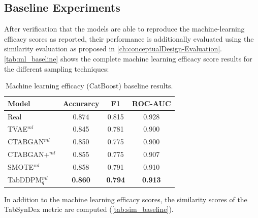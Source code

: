 
\subsection{Baseline Experiments}
\label{ch:Baseline}

After verification that the models are able to reproduce the machine-learning efficacy scores as reported,
their performance is additionally evaluated using the similarity evaluation as proposed in \autoref{ch:conceptualDesign-Evaluation}.
\autoref{tab:ml_baseline} shows the complete machine learning efficacy score results for the different sampling techniques:

\begin{table}[h]
	\centering
	\begin{tabular}{l|c|c|c}
		\hline
		\textbf{Model}     & \textbf{Accurarcy} & \textbf{F1}    & \textbf{ROC-AUC} \\ \hline
		Real               & 0.874              & 0.815          & 0.928            \\ \hline
		TVAE$^{ml}$        & 0.845              & 0.781          & 0.900            \\ \hline
		CTABGAN$^{ml}$     & 0.850              & 0.775          & 0.900            \\ \hline
		CTABGAN+$^{ml}$    & 0.855              & 0.775          & 0.907            \\ \hline
		SMOTE$^{ml}$       & 0.858              & 0.791          & 0.910            \\ \hline
		TabDDPM$^{ml}_{q}$ & \textbf{0.860}     & \textbf{0.794} & \textbf{0.913}   \\ \hline
	\end{tabular}
	\caption[Machine learning efficacy baseline]{Machine learning efficacy (CatBoost) baseline results.}
	\label{tab:ml_baseline}
\end{table}


In addition to the machine learning efficacy scores, the similarity scores of the TabSynDex metric are computed (\autoref{tab:sim_baseline}).

